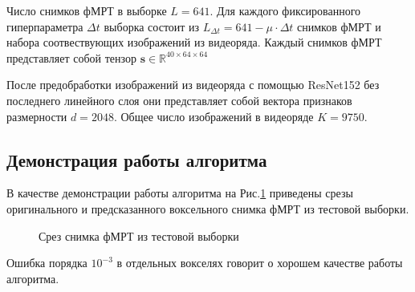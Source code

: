 \documentclass[12pt,twoside]{article}
\begin{document}
Число снимков фМРТ в выборке $L = 641$.  
Для каждого фиксированного гиперпараметра $\Delta t$ выборка состоит из $L_{\Delta t} = 641-\mu \cdot \Delta t$  снимков фМРТ и набора соотвествующих изображений из видеоряда. 
Каждый снимков фМРТ представляет собой тензор $\bm{s} \in \mathbb{R}^{{40} \times {64} \times {64}}$

После предобработки изображений из видеоряда с помощью ResNet152 без последнего линейного слоя они представляет собой вектора признаков размерности $d = 2048$. 
Общее число изображений в видеоряде $K = 9750$.

\subsection{Демонстрация работы алгоритма}
В качестве демонстрации работы алгоритма на Рис.\ref{fig:5} приведены срезы оригинального и предсказанного воксельного снимка фМРТ из тестовой выборки.
\begin{figure}[h!]
    \centering
    \hfill
    \hfill
    \caption{Срез снимка фМРТ из тестовой выборки}
    \label{fig:5}
\end{figure}
Ошибка порядка $10^{-3}$ в отдельных вокселях говорит о хорошем качестве работы алгоритма.
\end{document}
